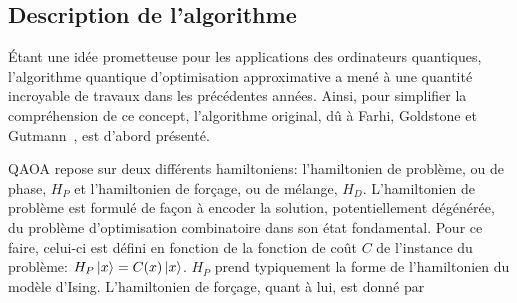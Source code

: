 



\subsection{Description de l'algorithme}
\label{subsec:description-algorithme}

Étant une idée prometteuse pour les applications des ordinateurs quantiques, l'algorithme quantique d'optimisation approximative a mené à une quantité incroyable de travaux dans les précédentes années. Ainsi, pour simplifier la compréhension de ce concept, l'algorithme original, dû à Farhi, Goldstone et Gutmann~\cite{farhiQuantumApproximateOptimization2014}, est d'abord présenté.

QAOA repose sur deux différents hamiltoniens: l'hamiltonien de problème, ou de phase, $H_{P}$ et l'hamiltonien de forçage, ou de mélange, $H_{D}$. L'hamiltonien de problème est formulé de façon à encoder la solution, potentiellement dégénérée, du problème d'optimisation combinatoire dans son état fondamental. Pour ce faire, celui-ci est défini en fonction de la fonction de coût $C$ de l'instance du problème: $H_{P}\ket{x} = C(x)\ket{x}$. $H_{P}$ prend typiquement la forme de l'hamiltonien du modèle d'Ising. L'hamiltonien de forçage, quant à lui, est donné par

